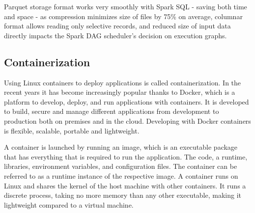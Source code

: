 Parquet storage format works very smoothly with Spark SQL - saving both time and space - as compression minimizes size of files by 75\% on average, columnar format allows reading only selective records, and reduced size of input data directly impacts the Spark DAG scheduler's decision on execution graphs. \cite{ibm_parquet}

\subsection{Containerization}
Using Linux containers to deploy applications is called containerization. In the recent years it has become increasingly popular thanks to Docker, which is a platform to develop, deploy, and run applications with containers. It is developed to build, secure and manage different applications from development to production both on premises and in the cloud. Developing with Docker containers is flexible, scalable, portable and lightweight.

A container is launched by running an image, which is an executable package that has everything that is required to run the application. The code, a runtime, libraries, environment variables, and configuration files. The container can be referred to as a runtime instance of the respective image. A container runs on Linux and shares the kernel of the host machine with other containers. It runs a discrete process, taking no more memory than any other executable, making it lightweight compared to a virtual machine.\cite{docker}